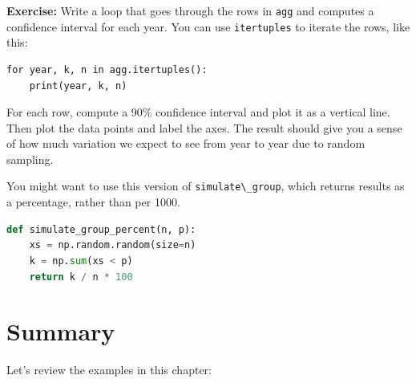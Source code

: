 \textbf{Exercise:} Write a loop that goes through the rows in
\passthrough{\lstinline!agg!} and computes a confidence interval for
each year. You can use \passthrough{\lstinline!itertuples!} to iterate
the rows, like this:

\begin{lstlisting}[style=output]
for year, k, n in agg.itertuples():
    print(year, k, n)
\end{lstlisting}

For each row, compute a 90\% confidence interval and plot it as a
vertical line. Then plot the data points and label the axes. The result
should give you a sense of how much variation we expect to see from year
to year due to random sampling.

You might want to use this version of
\passthrough{\lstinline!simulate\_group!}, which returns results as a
percentage, rather than per 1000.

\begin{lstlisting}[language=Python,style=source]
def simulate_group_percent(n, p):
    xs = np.random.random(size=n)
    k = np.sum(xs < p)
    return k / n * 100
\end{lstlisting}

\hypertarget{summary}{%
\section{Summary}\label{summary}}

Let's review the examples in this chapter:

